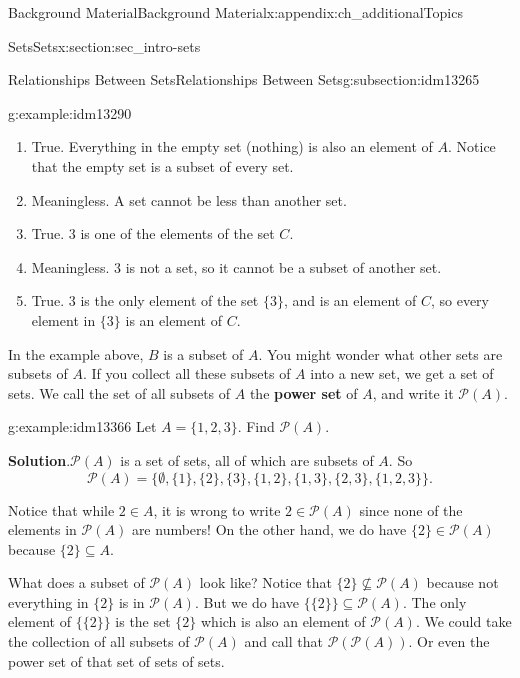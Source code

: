 \documentclass[oneside,10pt,]{book}
\newcommand{\terminology}[1]{\textbf{#1}}
\numberwithin{equation}{chapter}
\def\pow{\mathcal P}
\begin{document}
\begin{appendixptx}{Background Material}{}{Background Material}{}{}{x:appendix:ch_additionalTopics}
\begin{sectionptx}{Sets}{}{Sets}{}{}{x:section:sec_intro-sets}
\begin{subsectionptx}{Relationships Between Sets}{}{Relationships Between Sets}{}{}{g:subsection:idm13265}
\begin{example}{}{g:example:idm13290}
\begin{enumerate}
\item{}True. Everything in the empty set (nothing) is also an element of \(A\). Notice that the empty set is a subset of every set.%
\item{}Meaningless. A set cannot be less than another set.%
\item{}True. \(3\) is one of the elements of the set \(C\).%
\item{}Meaningless. \(3\) is not a set, so it cannot be a subset of another set.%
\item{}True. \(3\) is the only element of the set \(\{3\}\), and is an element of \(C\), so every element in \(\{3\}\) is an element of \(C\).%
\end{enumerate}
%
\end{example}
In the example above, \(B\) is a subset of \(A\). You might wonder what other sets are subsets of \(A\). If you collect all these subsets of \(A\) into a new set, we get a set of sets. We call the set of all subsets of \(A\) the \terminology{power set}  of \(A\), and write it \(\pow(A)\).%
\begin{example}{}{g:example:idm13366}%
Let \(A = \{1,2,3\}\). Find \(\pow(A)\).%
\par\smallskip%
\noindent\textbf{Solution}.\hypertarget{g:solution:idm13371}{}\quad{}\(\pow(A)\) is a set of sets, all of which are subsets of \(A\). So%
\begin{equation*}
\pow(A) = \{ \emptyset, \{1\}, \{2\}, \{3\}, \{1,2\}, \{1, 3\}, \{2,3\}, \{1,2,3\}\}.
\end{equation*}
%
\par
Notice that while \(2 \in A\), it is wrong to write \(2 \in \pow(A)\) since none of the elements in \(\pow(A)\) are numbers! On the other hand, we do have \(\{2\} \in \pow(A)\) because \(\{2\} \subseteq A\).%
\par
What does a subset of \(\pow(A)\) look like? Notice that \(\{2\} \not\subseteq \pow(A)\) because not everything in \(\{2\}\) is in \(\pow(A)\). But we do have \(\{ \{2\} \} \subseteq \pow(A)\). The only element of \(\{\{2\}\}\) is the set \(\{2\}\) which is also an element of \(\pow(A)\). We could take the collection of all subsets of \(\pow(A)\) and call that \(\pow(\pow(A))\). Or even the power set of that set of sets of sets.%
\end{example}

\end{subsectionptx}
\end{sectionptx}
\end{appendixptx}
\end{document}
